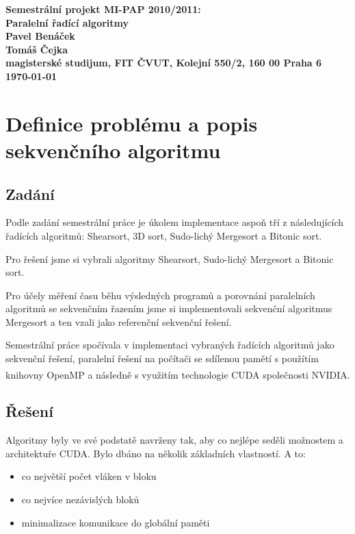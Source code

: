 \documentclass[12pt]{article}
\begin{document}

\begin{center}
\bf Semestrální projekt MI-PAP 2010/2011:\\[5mm]
    Paralelní řadící algoritmy\\[5mm]
    Pavel Benáček\\   
    Tomáš Čejka\\[2mm]
magisterské studijum, FIT ČVUT, Kolejní 550/2, 160 00 Praha 6\\[2mm]
\today
\end{center}
\newpage

\tableofcontents
\listoftables
\newpage
\section{Definice problému a popis sekvenčního algoritmu}
\subsection{Zadání}
Podle zadání semestrální práce je úkolem implementace aspoň tří z následujících
řadících algoritmů: Shearsort, 3D sort, Sudo-lichý Mergesort a Bitonic sort.

Pro řešení jsme si vybrali algoritmy Shearsort, Sudo-lichý Mergesort a Bitonic sort.

Pro účely měření času běhu výsledných programů a porovnání paralelních algoritmů se sekvenčním
řazením jsme si implementovali sekvenční algoritmus Mergesort a ten vzali jako referenční sekvenční
řešení.

Semestrální práce spočívala v implementaci vybraných řadících algoritmů jako sekvenční řešení, paralelní
řešení na počítači se sdílenou pamětí s použítím knihovny OpenMP a následně s využitím technologie CUDA
společnosti NVIDIA\textsuperscript{\tiny{\textregistered}}.

\label{sec:reseni}
\subsection{Řešení}
Algoritmy byly ve své podstatě navrženy tak, aby co nejlépe seděli možnostem a architektuře CUDA. Bylo dbáno na několik základních vlastností. A to:
\begin{itemize}
	\item co největší počet vláken v bloku
	\item co nejvíce nezávislých bloků
	\item minimalizace komunikace do globální paměti
\end{itemize}
\end{document}
